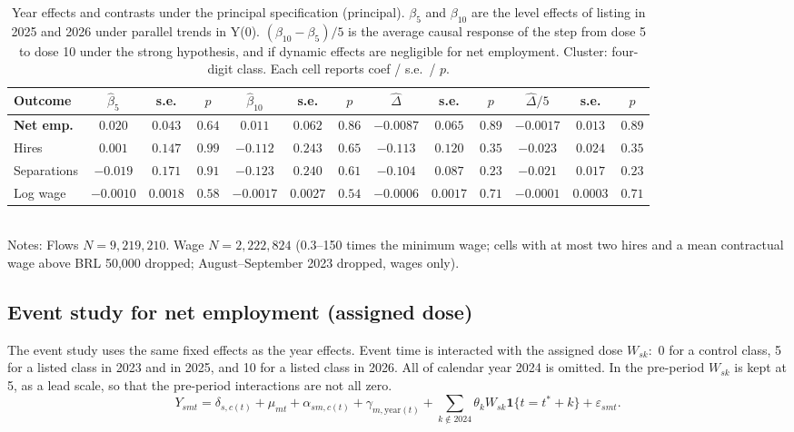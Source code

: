 \documentclass[12pt,a4paper]{article}
\begin{document}
\begin{table}[H]
\centering
\caption{Year effects and contrasts under the principal specification (principal).
$\beta_5$ and $\beta_{10}$ are the level effects of listing in 2025 and 2026 under parallel trends in Y(0).
$(\beta_{10}-\beta_5)/5$ is the average causal response of the step from dose 5 to dose 10 under the strong hypothesis, and if dynamic effects are negligible for net employment.
Cluster: four-digit class.
Each cell reports coef / s.e.\ / $p$.}
\label{tab:att_contrastes}
{\footnotesize
\setlength{\tabcolsep}{2.8pt}
\begin{tabular}{lcccccccccccc}
\toprule
Outcome & $\hat\beta_5$ & s.e. & $p$ & $\hat\beta_{10}$ & s.e. & $p$ & $\widehat{\Delta}$ & s.e. & $p$ & $\widehat{\Delta}/5$ & s.e. & $p$ \\
\midrule
\textbf{Net emp.} & $\mathbf{0.020}$ & $\mathbf{0.043}$ & $\mathbf{0.64}$ & $\mathbf{0.011}$ & $\mathbf{0.062}$ & $\mathbf{0.86}$ & $\mathbf{-0.0087}$ & $\mathbf{0.065}$ & $\mathbf{0.89}$ & $\mathbf{-0.0017}$ & $\mathbf{0.013}$ & $\mathbf{0.89}$ \\
Hires & $0.001$ & $0.147$ & $0.99$ & $-0.112$ & $0.243$ & $0.65$ & $-0.113$ & $0.120$ & $0.35$ & $-0.023$ & $0.024$ & $0.35$ \\
Separations & $-0.019$ & $0.171$ & $0.91$ & $-0.123$ & $0.240$ & $0.61$ & $-0.104$ & $0.087$ & $0.23$ & $-0.021$ & $0.017$ & $0.23$ \\
Log wage & $-0.0010$ & $0.0018$ & $0.58$ & $-0.0017$ & $0.0027$ & $0.54$ & $-0.0006$ & $0.0017$ & $0.71$ & $-0.0001$ & $0.0003$ & $0.71$ \\
\bottomrule
\end{tabular}}\\[0.4em]
{\footnotesize Notes: Flows $N=9{,}219{,}210$. Wage $N=2{,}222{,}824$ (0.3--150 times the minimum wage; cells with at most two hires and a mean contractual wage above BRL 50{,}000 dropped; August--September 2023 dropped, wages only).}
\end{table}

\subsection{Event study for net employment (assigned dose)}

The event study uses the same fixed effects as the year effects. Event time is interacted with the assigned dose $W_{sk}:$ 0 for a control class, 5 for a listed class in 2023 and in 2025, and 10 for a listed class in 2026. All of calendar year 2024 is omitted. In the pre-period $W_{sk}$ is kept at 5, as a lead scale, so that the pre-period interactions are not all zero.
\begin{equation}
Y_{smt}=\delta_{s,c(t)}+\mu_{mt}+\alpha_{sm,c(t)}+\gamma_{m,\mathrm{year}(t)}+\sum_{k\notin 2024}\theta_k W_{sk}\mathbf{1}\{t=t^{*}+k\}+\varepsilon_{smt}.
\end{equation}
\end{document}
